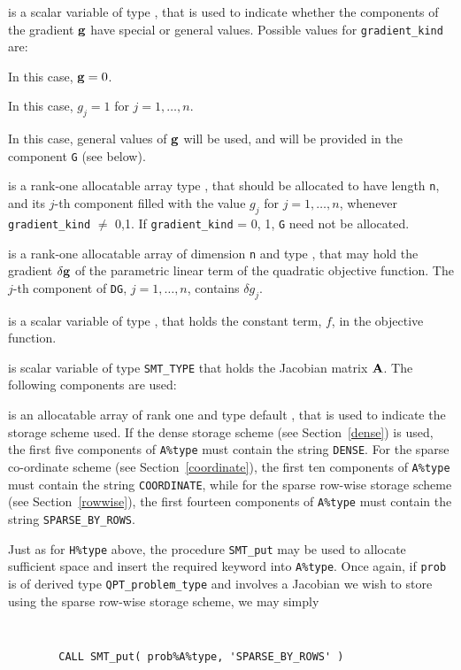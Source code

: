 \documentclass{galahad}
\newcommand{\packagename}{QPT}
\begin{document}
\begin{description}
 is a scalar variable of type \integer,
that is used to indicate whether the components of the gradient ${\mathbf{g}}$
have special or general values. Possible values for {\tt gradient\_kind} are:
\begin{description}
  In this case, ${\mathbf{g}} = 0$.

 In this case, $g_{j} = 1$ for $j = 1, \ldots , n$.

 In this case, general values of ${\mathbf{g}}$ will be used,
     and will be provided in the component {\tt G} (see below).
\end{description}

 is a rank-one allocatable array type \realdp, that
should be allocated to have length {\tt n}, and its $j$-th component
filled with the value $g_{j}$ for $j = 1, \ldots , n$,
whenever {\tt gradient\_kind} $\neq$ 0,1.
If {\tt gradient\_kind} {= 0, 1}, {\tt G} need not be allocated.

 is a rank-one allocatable array of dimension {\tt n} and type
\realdp, that may hold the gradient $\delta {\mathbf{g}}$
of the parametric linear term of the quadratic objective function.
The $j$-th component of
{\tt DG}, $j = 1,  \ldots ,  n$, contains $\delta g_{j}$.

 is a scalar variable of type
\realdp, that holds
the constant term, $f$, in the objective function.

 is scalar variable of type {\tt SMT\_TYPE}
that holds the Jacobian matrix ${\mathbf{A}}$. The following components are used:

\begin{description}

 is an allocatable array of rank one and type default
\character, that
is used to indicate the storage scheme used. If the dense storage scheme
(see Section~\ref{dense}) is used,
the first five components of {\tt A\%type} must contain the
string {\tt DENSE}.
For the sparse co-ordinate scheme (see Section~\ref{coordinate}),
the first ten components of {\tt A\%type} must contain the
string {\tt COORDINATE}, while
for the sparse row-wise storage scheme (see Section~\ref{rowwise}),
the first fourteen components of {\tt A\%type} must contain the
string {\tt SPARSE\_BY\_ROWS}.

Just as for {\tt H\%type} above, the procedure {\tt SMT\_put}
may be used to allocate sufficient space and insert the required keyword
into {\tt A\%type}.
Once again, if {\tt prob} is of derived type {\tt \packagename\_problem\_type}
and involves a Jacobian we wish to store using the sparse row-wise
storage scheme, we may simply
{\tt
\begin{verbatim}
        CALL SMT_put( prob%A%type, 'SPARSE_BY_ROWS' )
\end{verbatim}
}
\noindent


\end{description}
\end{description}
\end{document}

